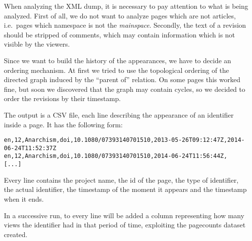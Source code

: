 When analyzing the XML dump, it is necessary to pay attention to what is being analyzed.
First of all, we do not want to analyze pages which are not articles, i.e.\ pages which namespace is not the \emph{mainspace}.
Secondly, the text of a revision should be stripped of comments, which may contain information which is not visible by the viewers.

Since we want to build the history of the appearances, we have to decide an ordering mechanism.
At first we tried to use the topological ordering of the directed graph induced by the ``parent of'' relation.
On some pages this worked fine, but soon we discovered that the graph may contain cycles, so we decided to order the revisions by their timestamp.

The output is a CSV file, each line describing the appearance of an identifier inside a page.
It has the following form:
\begin{verbatim}
en,12,Anarchism,doi,10.1080/07393140701510,2013-05-26T09:12:47Z,2014-06-24T11:52:37Z
en,12,Anarchism,doi,10.1080/07393140701510,2014-06-24T11:56:44Z,
[...]
\end{verbatim}
Every line contains the project name, the id of the page, the type of identifier, the actual identifier, the timestamp of the moment it appears and the timestamp when it ends.

In a successive run, to every line will be added a column representing how many views the identifier had in that period of time, exploiting the pagecounts dataset created.
